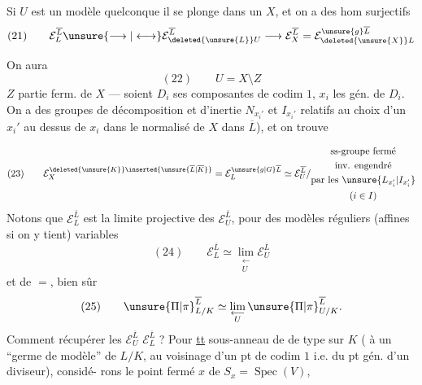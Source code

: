 
Si $U$ est un modèle quelconque\unsure{,|;} il se plonge dans un $X$, et on a des hom surjectifs
\[
(21)\qquad \mathcal E_L^{\overline L}\unsure{\longrightarrow|\longleftrightarrow}\mathcal E_{\deleted{\unsure{L}}U}^{\overline L}\longrightarrow\mathcal E_X^{\overline L}=\mathcal E_{\deleted{\unsure{X}}L}^{\unsure{g}\overline L}
\]

On aura 
\[
(22)\qquad U=X\setminus Z
\]
$Z$ partie ferm. de $X$ --- soient $D_i$ ses composantes de codim $1$, $x_i$ les  gén. de $D_i$. On a des groupes de décomposition et d'inertie $N_{x_i'}$ et $I_{x_i'}$   relatifs au choix d'un $x_i'$ au dessus de $x_i$ dans le normalisé de $X$ dans $\overline L$), et on trouve


\[
(23)\qquad
\mathcal E_X^{\deleted{\unsure{K}}\inserted{\unsure{\overline L|\overline K}}}
=\mathcal E_L^{\unsure{g|G}\overline L}
\simeq\mathcal E_U^{\overline L}/\begin{gathered}\text{ss-groupe fermé}\\\text{inv. engendré}\\\text{par les }\unsure{L_{x_i'}|I_{x_i'}}\\(i\in I)\end{gathered}
\]
Notons que $\mathcal E_L^{\overline L}$ est la limite
projective des $\mathcal E_U^{\overline L}$, pour des
modèles réguliers (affines si on y tient)
variables
\[
(24)\qquad\mathcal E_L^{\overline L}\simeq\lim_{\substack{\longleftarrow\\U}}\mathcal E_U^{\overline L}
\]
et de $=$, bien sûr
\[
(25)\qquad\unsure{\Pi|\pi}_{L/K}^{\overline L}\simeq\lim_{\substack{\longleftarrow\\U}}\unsure{\Pi|\pi}_{U/K}^{\overline L}.
\]
Comment récupérer les $\mathcal E_U^{\overline L}$ 
$\mathcal E_L^{\overline L}$ ? Pour \uline{tt}
sous-anneau  de  de type
 sur $K$ ( à un
``germe de modèle'' de $L/K$, au
voisinage d'un pt de codim $1$ i.e.
du pt gén. d'un diviseur), considé-\newline
rons le point fermé $x$ de $S_x=\operatorname{Spec}(V)$,

